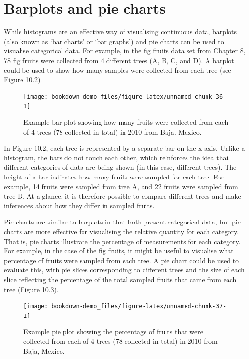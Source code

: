 \documentclass[
]{scrbook}
\begin{document}
\hypertarget{barplots-and-pie-charts}{%
\section{Barplots and pie charts}\label{barplots-and-pie-charts}}

While histograms are an effective way of visualising \protect\hyperlink{Chapter_5}{continuous data}, barplots (also known as `bar charts' or `bar graphs') and pie charts can be used to visualise \protect\hyperlink{Chapter_5}{categorical data}.
For example, in the \href{https://raw.githubusercontent.com/bradduthie/statistical_techniques/main/data/fig_fruits.csv}{fig fruits} data set from \protect\hyperlink{Chapter_8}{Chapter 8}, 78 fig fruits were collected from 4 different trees (A, B, C, and D).
A barplot could be used to show how many samples were collected from each tree (see Figure 10.2).

\begin{figure}
\texttt{[image: bookdown-demo\_files/figure-latex/unnamed-chunk-36-1]} \caption{Example bar plot showing how many fruits were collected from each of 4 trees (78 collected in total) in 2010 from Baja, Mexico.}\label{fig:unnamed-chunk-36}
\end{figure}

In Figure 10.2, each tree is represented by a separate bar on the x-axis.
Unlike a histogram, the bars do not touch each other, which reinforces the idea that different categories of data are being shown (in this case, different trees).
The height of a bar indicates how many fruits were sampled for each tree.
For example, 14 fruits were sampled from tree A, and 22 fruits were sampled from tree B.
At a glance, it is therefore possible to compare different trees and make inferences about how they differ in sampled fruits.

Pie charts are similar to barplots in that both present categorical data, but pie charts are more effective for visualising the relative quantity for each category.
That is, pie charts illustrate the percentage of measurements for each category.
For example, in the case of the fig fruits, it might be useful to visualise what percentage of fruits were sampled from each tree.
A pie chart could be used to evaluate this, with pie slices corresponding to different trees and the size of each slice reflecting the percentage of the total sampled fruits that came from each tree (Figure 10.3).

\begin{figure}
\texttt{[image: bookdown-demo\_files/figure-latex/unnamed-chunk-37-1]} \caption{Example pie plot showing the percentage of fruits that were collected from each of 4 trees (78 collected in total) in 2010 from Baja, Mexico.}\label{fig:unnamed-chunk-37}
\end{figure}
\end{document}
